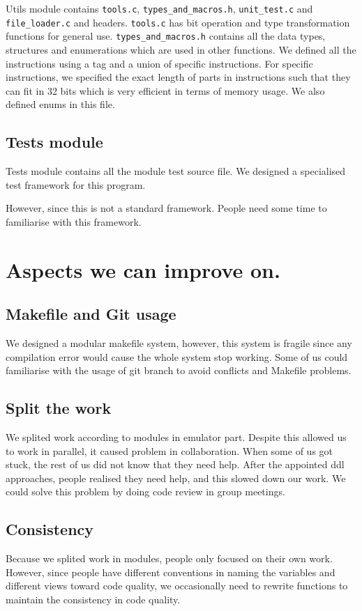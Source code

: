 \documentclass[10pt]{article}
\begin{document}
	Utils module contains \texttt{tools.c}, \texttt{types\_and\_macros.h}, \texttt{unit\_test.c} and \texttt{file\_loader.c} and headers. \texttt{tools.c} has bit operation and type transformation functions for general use. \texttt{types\_and\_macros.h} contains all the data types, structures and enumerations which are used in other functions. We defined all the instructions using a tag and a union of specific instructions. For specific instructions, we specified the exact length of parts in instructions such that they can fit in 32 bits which is very efficient in terms of memory usage. We also defined enums in this file.

  \subsection{Tests module}

	Tests module contains all the module test source file. We designed a specialised test framework for this program.

  However, since this is not a standard framework. People need some time to familiarise with this framework.

  \section{Aspects we can improve on.}

  \subsection{Makefile and Git usage}

  We designed a modular makefile system, however, this system is fragile since any compilation error would cause the whole system stop working. Some of us could familiarise with the usage of git branch to avoid conflicts and Makefile problems.

  \subsection{Split the work}

  We splited work according to modules in emulator part. Despite this allowed us to work in parallel, it caused problem in collaboration. When some of us got stuck, the rest of us did not know that they need help. After the appointed ddl approaches, people realised they need help, and this slowed down our work. We could solve this problem by doing code review in group meetings.

  \subsection{Consistency}

  Because we splited work in modules, people only focused on their own work. However, since people have different conventions in naming the variables and different views toward code quality, we occasionally need to rewrite functions to maintain the consistency in code quality.
\end{document}

